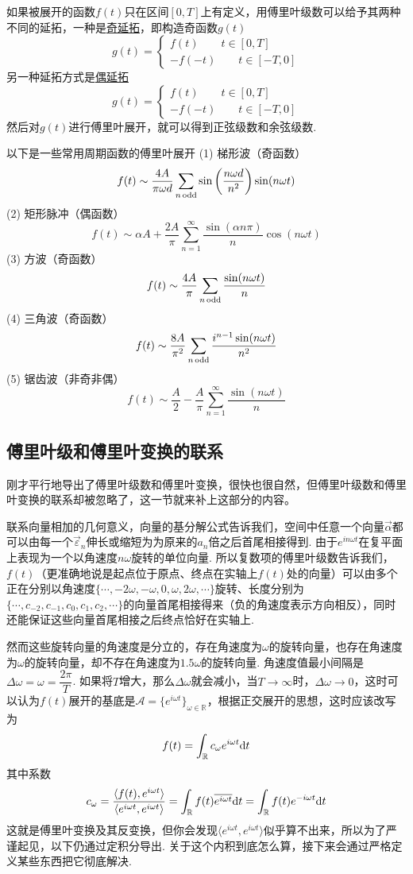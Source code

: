 \documentclass[main.tex]{subfiles}
\begin{document}
如果被展开的函数\(f(t)\)只在区间\([0,T]\)上有定义，用傅里叶级数可以给予其两种不同的延拓，一种是\uline{奇延拓}，即构造奇函数\(g(t)\)
\[g(t)=\begin{cases} f(t) \qquad t\in[0,T] \\ -f(-t) \qquad t \in [-T,0]\end{cases}\]
另一种延拓方式是\uline{偶延拓}
\[g(t)=\begin{cases} f(t) \qquad t\in[0,T] \\ -f(-t) \qquad t \in [-T,0]\end{cases}\]
然后对\(g(t)\)进行傅里叶展开，就可以得到正弦级数和余弦级数.

以下是一些常用周期函数的傅里叶展开
\newline
(1) 梯形波（奇函数）
\[f(t)\sim\frac{4A}{\pi\omega d}\sum_{n\,{\rm odd}}\sin\left(\frac{n\omega d}{n^2}\right)\sin(n\omega t)\]
(2) 矩形脉冲（偶函数）
\[f(t)\sim\alpha A + \frac{2A}{\pi}\sum_{n=1}^{\infty}\frac{\sin(\alpha n \pi)}{n} \cos(n\omega t)\]
(3) 方波（奇函数）
\[f(t) \sim \frac{4A}{\pi}\sum_{n\,{\rm odd}} \frac{\sin(n\omega t)}{n}\]
(4) 三角波（奇函数）
\[f(t) \sim \frac{8A}{\pi^2}\sum_{n\,{\rm odd}}\frac{i^{n-1}\sin(n\omega t)}{n^2}\]
(5) 锯齿波（非奇非偶）
\[f(t) \sim \frac{A}{2}-\frac{A}{\pi}\sum_{n=1}^{\infty} \frac{\sin(n\omega t)}{n}\]


\subsection{傅里叶级和傅里叶变换的联系}

刚才平行地导出了傅里叶级数和傅里叶变换，很快也很自然，但傅里叶级数和傅里叶变换的联系却被忽略了，这一节就来补上这部分的内容。

联系向量相加的几何意义，向量的基分解公式告诉我们，空间中任意一个向量\(\vec{\alpha}\)都可以由每一个\(\vec{\varepsilon}_n\)伸长或缩短为为原来的\(a_n\)倍之后首尾相接得到. 由于\(e^{in\omega t}\)在复平面上表现为一个以角速度\(n\omega\)旋转的单位向量. 所以复数项的傅里叶级数告诉我们，\(f(t)\)（更准确地说是起点位于原点、终点在实轴上\(f(t)\)处的向量）可以由多个正在分别以角速度\(\{\cdots, -2\omega, -\omega, 0, \omega, 2\omega, \cdots\}\)旋转、长度分别为\(\{\cdots, c_{-2}, c_{-1}, c_0, c_1, c_2, \cdots\}\)的向量首尾相接得来（负的角速度表示方向相反），同时还能保证这些向量首尾相接之后终点恰好在实轴上.

然而这些旋转向量的角速度是分立的，存在角速度为\(\omega\)的旋转向量，也存在角速度为\(\omega\)的旋转向量，却不存在角速度为\(1.5\omega\)的旋转向量. 角速度值最小间隔是\(\Delta \omega = \omega =\dfrac{2\pi}{T}\). 如果将\(T\)增大，那么\(\Delta \omega\)就会减小，当\(T\to\infty\)时，\(\Delta \omega \to 0\)，这时可以认为\(f(t)\)展开的基底是\(\mathcal{A}=\{e^{i\omega t}\}_{\omega \in \mathbb{R}}\)，根据正交展开的思想，这时应该改写为
\[f(t)=\int_{\mathbb{R}}c_\omega e^{i\omega t}{\rm d}t\]
其中系数
\[c_\omega = \frac{\langle f(t), e^{i\omega t} \rangle}{\langle e^{i\omega t},e^{i \omega t} \rangle} = \int_{\mathbb{R}}f(t)\overline{e^{i\omega t}}{\rm d}t=\int_{\mathbb{R}}f(t)e^{-i\omega t}{\rm d}t\]
这就是傅里叶变换及其反变换，但你会发现\(\langle e^{i\omega t},e^{i \omega t} \rangle\)似乎算不出来，所以为了严谨起见，以下仍通过定积分导出. 关于这个内积到底怎么算，接下来会通过严格定义某些东西把它彻底解决.
\end{document}
